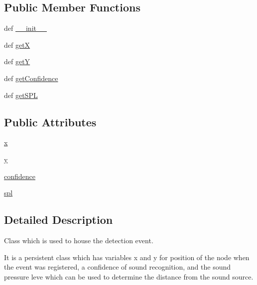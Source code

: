 \subsection*{Public Member Functions}
\begin{DoxyCompactItemize}
\item 
def \hyperlink{classlocaudio_1_1detectionevent_1_1DetectionEvent_aa998c7524a9484b5a3a7f80d4eba2280}{\-\_\-\-\_\-init\-\_\-\-\_\-}
\item 
def \hyperlink{classlocaudio_1_1detectionevent_1_1DetectionEvent_a0e0834f59fd2a15cfd2b6c9af28a4aa0}{get\-X}
\item 
def \hyperlink{classlocaudio_1_1detectionevent_1_1DetectionEvent_ae3bdb3a490451b319a738a3e5707d8cb}{get\-Y}
\item 
def \hyperlink{classlocaudio_1_1detectionevent_1_1DetectionEvent_a7a4898ab90d97798dff70f4a2464f4c9}{get\-Confidence}
\item 
def \hyperlink{classlocaudio_1_1detectionevent_1_1DetectionEvent_aa7a37ee69b6b0612bfb08411d4007713}{get\-S\-P\-L}
\end{DoxyCompactItemize}
\subsection*{Public Attributes}
\begin{DoxyCompactItemize}
\item 
\hyperlink{classlocaudio_1_1detectionevent_1_1DetectionEvent_ae36950069a6f55e1f6e0251dbe80b0d4}{x}
\item 
\hyperlink{classlocaudio_1_1detectionevent_1_1DetectionEvent_aab867d871d3ab2bc608936ab64051b56}{y}
\item 
\hyperlink{classlocaudio_1_1detectionevent_1_1DetectionEvent_af0b955e105202f670cee964ce52d911f}{confidence}
\item 
\hyperlink{classlocaudio_1_1detectionevent_1_1DetectionEvent_aba6f9b944aea803742ef4aed6e34f215}{spl}
\end{DoxyCompactItemize}


\subsection{Detailed Description}
Class which is used to house the detection event. 

It is a persistent class which has variables x and y for position of the node when the event was registered, a confidence of sound recognition, and the sound pressure leve which can be used to determine the distance from the sound source. 

